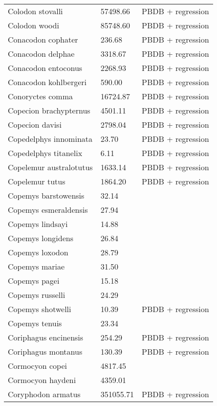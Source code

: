 \documentclass{article}
\begin{document}
\begin{center}
\begin{longtable}{p{} p{} p{}}
    Colodon stovalli & 57498.66 & PBDB + regression \\ 
    Colodon woodi & 85748.60 & PBDB + regression \\ 
    Conacodon cophater & 236.68 & PBDB + regression \\ 
    Conacodon delphae & 3318.67 & PBDB + regression \\ 
    Conacodon entoconus & 2268.93 & PBDB + regression \\ 
    Conacodon kohlbergeri & 590.00 & PBDB + regression \\ 
    Conoryctes comma & 16724.87 & PBDB + regression \\ 
    Copecion brachypternus & 4501.11 & PBDB + regression \\ 
    Copecion davisi & 2798.04 & PBDB + regression \\ 
    Copedelphys innominata & 23.70 & PBDB + regression \\ 
    Copedelphys titanelix & 6.11 & PBDB + regression \\ 
    Copelemur australotutus & 1633.14 & PBDB + regression \\ 
    Copelemur tutus & 1864.20 & PBDB + regression \\ 
    Copemys barstowensis & 32.14 & \cite{Tomiya2013} \\ 
    Copemys esmeraldensis & 27.94 & \cite{Tomiya2013} \\ 
    Copemys lindsayi & 14.88 & \cite{Tomiya2013} \\ 
    Copemys longidens & 26.84 & \cite{Tomiya2013} \\ 
    Copemys loxodon & 28.79 & \cite{Tomiya2013} \\ 
    Copemys mariae & 31.50 & \cite{Tomiya2013} \\ 
    Copemys pagei & 15.18 & \cite{Tomiya2013} \\ 
    Copemys russelli & 24.29 & \cite{Tomiya2013} \\ 
    Copemys shotwelli & 10.39 & PBDB + regression \\ 
    Copemys tenuis & 23.34 & \cite{Tomiya2013} \\ 
    Coriphagus encinensis & 254.29 & PBDB + regression \\ 
    Coriphagus montanus & 130.39 & PBDB + regression \\ 
    Cormocyon copei & 4817.45 & \cite{Tomiya2013} \\ 
    Cormocyon haydeni & 4359.01 & \cite{Tomiya2013} \\ 
    Coryphodon armatus & 351055.71 & PBDB + regression \\ 

\end{longtable}
\end{center}
\end{document}
